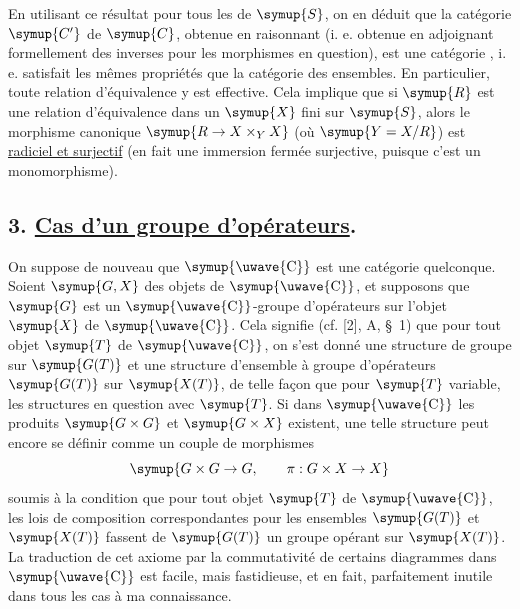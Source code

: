 En utilisant ce résultat pour tous les  de $\symup{S}$, on en
déduit que la catégorie $\symup{C'}$  de $\symup{C}$, obtenue en
raisonnant  (i. e. obtenue en
adjoignant formellement des inverses pour les morphismes en question), est une
catégorie , i. e. satisfait les mêmes propriétés  que la catégorie des ensembles. En particulier, toute relation
d'équivalence y est effective. Cela implique que si $\symup{R}$ est une relation
d'équivalence dans un $\symup{X}$ fini sur $\symup{S}$, alors le morphisme canonique $\symup{R\to X\times_Y X}$ (où $\symup{Y=X/R}$) est \uline{radiciel et surjectif} (en fait une immersion fermée surjective,
puisque c'est un monomorphisme).

\subsection*{\textnormal{3. \uline{Cas d'un groupe d'opérateurs}.}}

On suppose de nouveau que $\symup{\text{\uwave{C}}}$ est une catégorie quelconque. Soient
$\symup{G,X}$ des objets de $\symup{\text{\uwave{C}}}$, et supposons que $\symup{G}$ est un
$\symup{\text{\uwave{C}}}$-groupe d'opérateurs sur l'objet $\symup{X}$ de $\symup{\text{\uwave{C}}}$. Cela
signifie (cf. [2], A, \S~1) que pour tout objet $\symup{T}$ de $\symup{\text{\uwave{C}}}$, on s'est
donné une structure de groupe sur $\symup{G(T)}$ et une structure d'ensemble à groupe
d'opérateurs $\symup{G(T)}$ sur $\symup{X(T)}$, de telle façon que pour $\symup{T}$ variable, les
structures en question  avec $\symup{T}$. Si dans
$\symup{\text{\uwave{C}}}$ les produits $\symup{G\times G}$ et $\symup{G\times X}$ existent, une telle
structure peut encore se définir comme un couple de morphismes
\[
  \symup{G\times G\to G,
  \qquad \pi:G\times X\to X}
\]
soumis à la condition que pour tout objet $\symup{T}$ de $\symup{\text{\uwave{C}}}$, les lois de
composition correspondantes pour les ensembles $\symup{G(T)}$ et $\symup{X(T)}$ fassent de
$\symup{G(T)}$ un groupe opérant sur $\symup{X(T)}$. La traduction de cet axiome par la
commutativité de certains diagrammes dans $\symup{\text{\uwave{C}}}$ est facile, mais
fastidieuse, et en fait, parfaitement inutile dans tous les cas à ma
connaissance.

